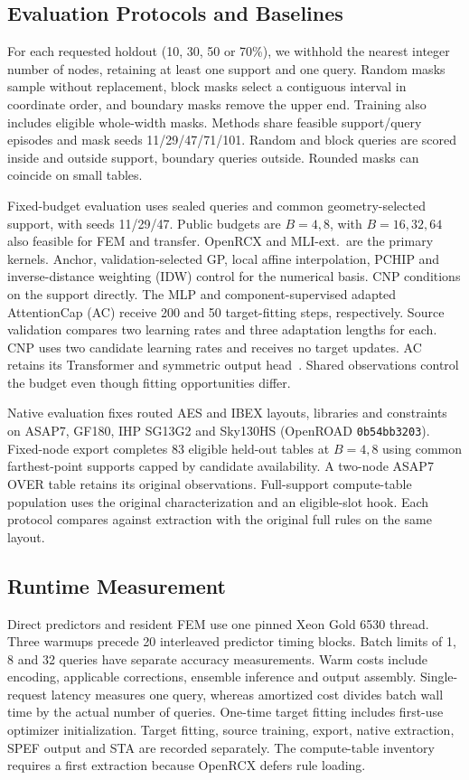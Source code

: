 \subsection{Evaluation Protocols and Baselines}
For each requested holdout (10, 30, 50 or 70\%), we withhold the nearest integer number of nodes, retaining at least one support and one query. Random masks sample without replacement, block masks select a contiguous interval in coordinate order, and boundary masks remove the upper end. Training also includes eligible whole-width masks. Methods share feasible support/query episodes and mask seeds 11/29/47/71/101. Random and block queries are scored inside and outside support, boundary queries outside. Rounded masks can coincide on small tables.

Fixed-budget evaluation uses sealed queries and common geometry-selected support, with seeds 11/29/47. Public budgets are $B=4,8$, with $B=16,32,64$ also feasible for FEM and transfer. OpenRCX and MLI-ext.\ are the primary kernels. Anchor, validation-selected GP, local affine interpolation, PCHIP and inverse-distance weighting (IDW) control for the numerical basis. CNP conditions on the support directly. The MLP and component-supervised adapted AttentionCap (AC) receive 200 and 50 target-fitting steps, respectively. Source validation compares two learning rates and three adaptation lengths for each. CNP uses two candidate learning rates and receives no target updates. AC retains its Transformer and symmetric output head~\cite{attentioncode}. Shared observations control the budget even though fitting opportunities differ.

Native evaluation fixes routed AES and IBEX layouts, libraries and constraints on ASAP7, GF180, IHP SG13G2 and Sky130HS (OpenROAD \texttt{0b54bb3203}). Fixed-node export completes 83 eligible held-out tables at $B=4,8$ using common farthest-point supports capped by candidate availability. A two-node ASAP7 OVER table retains its original observations. Full-support compute-table population uses the original characterization and an eligible-slot hook. Each protocol compares against extraction with the original full rules on the same layout.

\subsection{Runtime Measurement}
Direct predictors and resident FEM use one pinned Xeon Gold 6530 thread. Three warmups precede 20 interleaved predictor timing blocks. Batch limits of 1, 8 and 32 queries have separate accuracy measurements. Warm costs include encoding, applicable corrections, ensemble inference and output assembly. Single-request latency measures one query, whereas amortized cost divides batch wall time by the actual number of queries. One-time target fitting includes first-use optimizer initialization. Target fitting, source training, export, native extraction, SPEF output and STA are recorded separately. The compute-table inventory requires a first extraction because OpenRCX defers rule loading.

